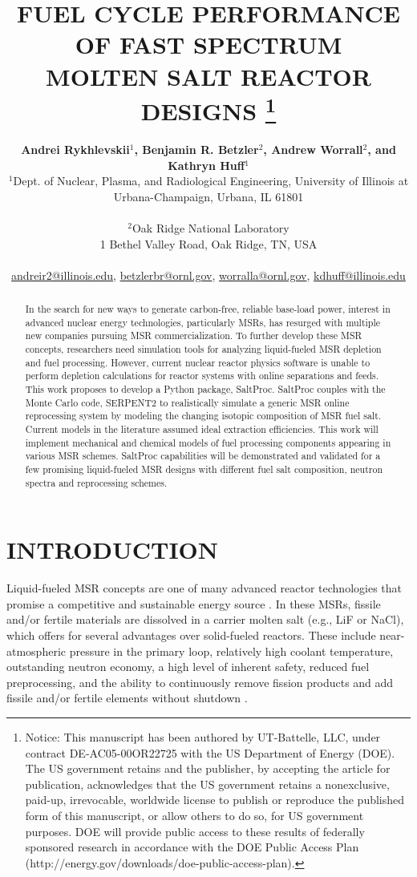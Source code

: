 \documentclass[letterpaper]{mandc2019}
\title{FUEL CYCLE PERFORMANCE OF FAST SPECTRUM \\
  MOLTEN SALT REACTOR DESIGNS
\footnote{Notice:  This manuscript has been authored by UT-Battelle, LLC, under contract DE-AC05-00OR22725 with the US Department of Energy (DOE). The US government retains and the publisher, by accepting the article for publication, acknowledges that the US government retains a nonexclusive, paid-up, irrevocable, worldwide license to publish or reproduce the published form of this manuscript, or allow others to do so, for US government purposes. DOE will provide public access to these results of federally sponsored research in accordance with the DOE Public Access Plan (http://energy.gov/downloads/doe-public-access-plan).}
		}
\author{%
  \textbf{Andrei Rykhlevskii$^1$, Benjamin R. Betzler$^2$, Andrew Worrall$^2$, and Kathryn Huff$^1$} \\
  $^1$Dept. of Nuclear, Plasma, and Radiological Engineering, University of Illinois at \\
  Urbana-Champaign, Urbana, IL 61801 \\
\\
  $^2$Oak Ridge National Laboratory \\
1 Bethel Valley Road, Oak Ridge, TN, USA  \\
\\
  \url{andreir2@illinois.edu}, \url{betzlerbr@ornl.gov}, \url{worralla@ornl.gov}, \url{kdhuff@illinois.edu}
}
\begin{document}
\maketitle
\justify

\begin{abstract}
In the search for new ways to generate carbon-free, reliable 
base-load power, interest in advanced nuclear energy technologies, 
particularly \glspl{MSR}, has resurged with multiple new companies 
pursuing \gls{MSR} commercialization. To further develop these \gls{MSR} 
concepts, researchers need simulation tools for analyzing liquid-fueled 
\gls{MSR} depletion and fuel processing. However, current nuclear reactor 
physics software is unable to perform depletion calculations for 
reactor systems with online separations and feeds. This work proposes to 
develop a Python package, SaltProc. SaltProc couples 
with the Monte Carlo code, SERPENT2 to realistically simulate a generic 
\gls{MSR} online reprocessing system by modeling the changing isotopic 
composition of \gls{MSR} fuel salt. Current models in the literature 
assumed ideal extraction efficiencies. This work will implement mechanical 
and chemical 
models of fuel processing components appearing in various 
\gls{MSR} schemes. 
SaltProc capabilities will be demonstrated and validated for a few 
promising liquid-fueled \gls{MSR} designs with different fuel salt 
composition, neutron spectra and reprocessing schemes.
\end{abstract}

\section{INTRODUCTION}
\label{sec:intro}
Liquid-fueled \gls{MSR} concepts are one of many advanced reactor technologies that promise a competitive and sustainable energy source \cite{siemer_why_2015}. In these \gls{MSR}s, fissile and/or fertile materials are dissolved in a carrier molten salt (e.g., LiF or NaCl), which offers for several advantages over solid-fueled reactors. These include near-atmospheric pressure in the primary loop, relatively high coolant temperature, outstanding neutron economy, a high level of inherent safety,
reduced fuel preprocessing, and the ability to continuously remove fission products and add fissile and/or fertile elements without shutdown \cite{leblanc_molten_2010}.
\end{document}
